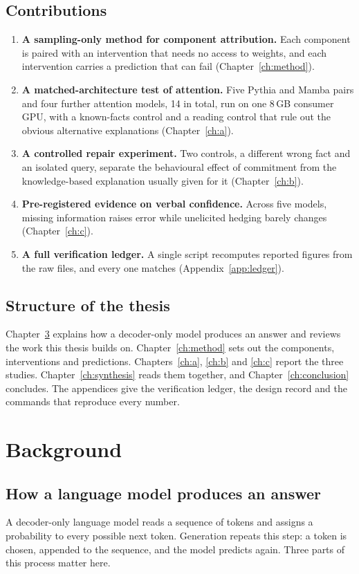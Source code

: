 \documentclass[11pt,a4paper,oneside]{report}
\begin{document}
\section{Contributions}
\begin{enumerate}
\item \textbf{A sampling-only method for component attribution.} Each component is paired with an intervention that needs no access to weights, and each intervention carries a prediction that can fail (Chapter~\ref{ch:method}).
\item \textbf{A matched-architecture test of attention.} Five Pythia and Mamba pairs and four further attention models, 14 in total, run on one 8\,GB consumer GPU, with a known-facts control and a reading control that rule out the obvious alternative explanations (Chapter~\ref{ch:a}).
\item \textbf{A controlled repair experiment.} Two controls, a different wrong fact and an isolated query, separate the behavioural effect of commitment from the knowledge-based explanation usually given for it (Chapter~\ref{ch:b}).
\item \textbf{Pre-registered evidence on verbal confidence.} Across five models, missing information raises error while unelicited hedging barely changes (Chapter~\ref{ch:c}).
\item \textbf{A full verification ledger.} A single script recomputes \ledgertotal{} reported figures from the raw files, and every one matches (Appendix~\ref{app:ledger}).
\end{enumerate}

\section{Structure of the thesis}
Chapter~\ref{ch:background} explains how a decoder-only model produces an answer and reviews the work this thesis builds on. Chapter~\ref{ch:method} sets out the components, interventions and predictions. Chapters~\ref{ch:a}, \ref{ch:b} and \ref{ch:c} report the three studies. Chapter~\ref{ch:synthesis} reads them together, and Chapter~\ref{ch:conclusion} concludes. The appendices give the verification ledger, the design record and the commands that reproduce every number.

\chapter{Background}
\label{ch:background}

\section{How a language model produces an answer}
A decoder-only language model reads a sequence of tokens and assigns a probability to every possible next token. Generation repeats this step: a token is chosen, appended to the sequence, and the model predicts again. Three parts of this process matter here.
\end{document}

